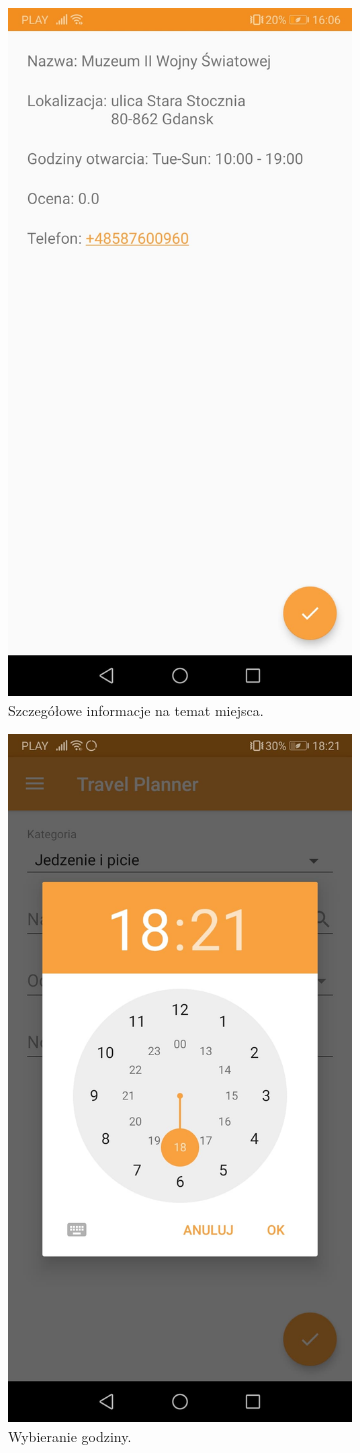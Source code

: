 \documentclass[10pt,twoside,a4paper]{report}
\begin{document}
\begin{figure}[h]
\begin{subfigure}{0.3\textwidth}
\includegraphics[width=0.9\linewidth, width=5cm]{placeDescription}
\caption{Szczegółowe informacje na temat miejsca.}
\label{fig:placeDescription}
\end{subfigure}
\begin{subfigure}{0.5\textwidth}
\centering
\includegraphics[width=0.9\linewidth, width=5cm]{clock}
\caption{Wybieranie godziny.}
\label{fig:clock}
\end{subfigure}
\begin{subfigure}{0.5\textwidth}
\centering

\end{subfigure}
\end{figure}
\end{document}
